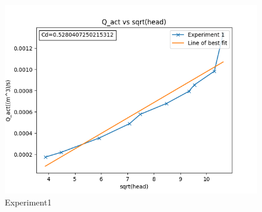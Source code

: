\begin{figure}[H]
            \centering
        \includegraphics[width=.85\textwidth]{Figures/Experiment1.png}
            \caption{Experiment1}
            \label{fig: Experiment1}
        \end{figure}
